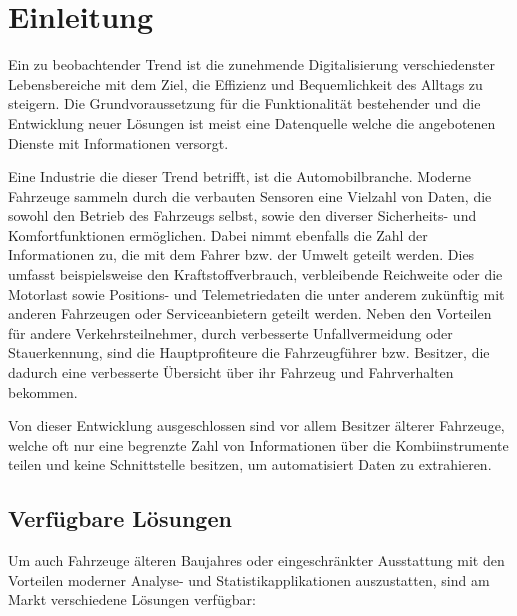 \chapter{Einleitung}
Ein zu beobachtender Trend ist die zunehmende Digitalisierung verschiedenster Lebensbereiche mit dem Ziel, die Effizienz und Bequemlichkeit des Alltags zu steigern. Die Grundvoraussetzung für die Funktionalität bestehender und die Entwicklung neuer Lösungen ist meist eine Datenquelle welche die angebotenen Dienste mit Informationen versorgt. 

Eine Industrie die dieser Trend betrifft, ist die Automobilbranche. Moderne Fahrzeuge sammeln durch die verbauten Sensoren eine Vielzahl von Daten, die sowohl den Betrieb des Fahrzeugs selbst, sowie den diverser Sicherheits- und Komfortfunktionen ermöglichen. Dabei nimmt ebenfalls die Zahl der Informationen zu, die mit dem Fahrer bzw. der Umwelt geteilt werden. Dies umfasst beispielsweise den Kraftstoffverbrauch, verbleibende Reichweite oder die Motorlast sowie Positions- und Telemetriedaten die unter anderem zukünftig mit anderen Fahrzeugen oder Serviceanbietern geteilt werden. Neben den Vorteilen für andere Verkehrsteilnehmer, durch verbesserte Unfallvermeidung oder Stauerkennung, sind die Hauptprofiteure die Fahrzeugführer bzw. Besitzer, die dadurch eine verbesserte Übersicht über ihr Fahrzeug und Fahrverhalten bekommen.

Von dieser Entwicklung ausgeschlossen sind vor allem Besitzer älterer Fahrzeuge, welche oft nur eine begrenzte Zahl von Informationen über die Kombiinstrumente teilen und keine Schnittstelle besitzen, um automatisiert Daten zu extrahieren. 

\section{Verfügbare Lösungen}
\label{sec:solutions}
Um auch Fahrzeuge älteren Baujahres oder eingeschränkter Ausstattung mit den Vorteilen moderner Analyse- und Statistikapplikationen auszustatten, sind am Markt verschiedene Lösungen verfügbar:

